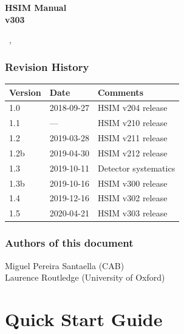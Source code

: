 \documentclass[12pt]{report}
\def\mydate{\leavevmode\hbox{\the\day~\monthname, \the\year}}
\begin{document}
\begin{titlepage}

\vspace*{4cm}
\begin{center}

{\selectfont
\Huge
\textbf{
HSIM Manual\\[0.5ex]
\Large
v303}
\vspace{2cm}

\large
\mydate
}
\end{center}
\vspace*{\fill}


\end{titlepage}

\tableofcontents

\vfill
\subsection*{Revision History}

\begin{table}[h]
\label{tab:revision}
\begin{tabular}{lll}
\hline
Version & Date & Comments \\
\hline
1.0 & 2018-09-27 & HSIM v204 release \\
1.1 & --- & HSIM v210 release \\
1.2 & 2019-03-28 & HSIM v211 release \\
1.2b & 2019-04-30 & HSIM v212 release \\
1.3 & 2019-10-11 & Detector systematics \\
1.3b & 2019-10-16 & HSIM v300 release \\
1.4 & 2019-12-16 & HSIM v302 release \\
1.5 & 2020-04-21 & HSIM v303 release \\
\hline
\end{tabular}
\end{table}


\subsection*{Authors of this document}
Miguel Pereira Santaella (CAB) \\
Laurence Routledge (University of Oxford)

\clearpage

\chapter{Quick Start Guide}
\end{document}
